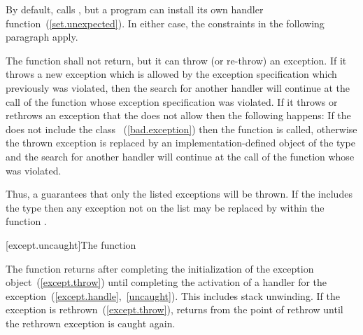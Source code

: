 \pnum
\enternote By default,  calls , but a
program can install its own handler function~(\ref{set.unexpected}). In either case, the
constraints in the following paragraph apply. \exitnote

\pnum
The
function shall not return, but it can throw (or re-throw) an exception.
If it throws a new exception which is allowed by the exception specification
which previously was violated, then the search for another handler
will continue at the call of the function whose exception specification was violated.
If it throws or rethrows an exception that the
does not allow
then the following happens:
%
If the
does not include the class
~(\ref{bad.exception})
then the function
is called, otherwise the thrown exception is replaced by an
implementation-defined object of the type
and the search for another handler will continue at the call of the function
whose
was violated.

\pnum
Thus,
a 
guarantees that only the listed exceptions will be thrown.
If the
includes the type
then any exception not on the list may be replaced by
within the function
.

[except.uncaught]{The  function}%

\pnum
The function
returns
after completing
the initialization of the exception object~(\ref{except.throw})
until completing
the
activation of a handler for the exception~(\ref{except.handle},~\ref{uncaught}).
This includes stack unwinding.
If the exception is rethrown~(\ref{except.throw}),
returns
from the point of rethrow until the rethrown exception is caught again.%
